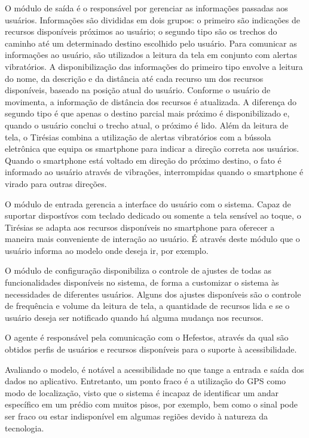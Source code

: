 \documentclass[english,brazilian]{UNISINOSmonografia}
\begin{document}
O módulo de saída é o responsável por gerenciar as informações passadas aos usuários. Informações são divididas em dois grupos: o primeiro são indicações de recursos disponíveis próximos ao usuário; o segundo tipo são os trechos do caminho até um determinado destino escolhido pelo usuário. Para comunicar as informações ao usuário, são utilizados a leitura da tela em conjunto com alertas vibratórios. A disponibilização das informações do primeiro tipo envolve a leitura do nome, da descrição e da distância até cada recurso um dos recursos disponíveis, baseado na posição atual do usuário. Conforme o usuário de movimenta, a informação de distância dos recursos é atualizada. A diferença do segundo tipo é que apenas o destino parcial mais próximo é disponibilizado e, quando o usuário conclui o trecho atual, o próximo é lido. Além da leitura de tela, o Tirésias combina a utilização de alertas vibratórios com a bússola eletrônica que equipa os smartphone para indicar a direção correta aos usuários. Quando o smartphone está voltado em direção do próximo destino, o fato é informado ao usuário através de vibrações, interrompidas quando o smartphone é virado para outras direções.

O módulo de entrada gerencia a interface do usuário com o sistema. Capaz de suportar dispostívos com teclado dedicado ou somente a tela sensível ao toque, o Tirésias se adapta aos recursos disponíveis no smartphone para oferecer a maneira mais conveniente de interação ao usuário. É através deste módulo que o usuário informa ao modelo onde deseja ir, por exemplo.

O módulo de configuração disponibiliza o controle de ajustes de todas as funcionalidades disponíveis no sistema, de forma a customizar o sistema às necessidades de diferentes usuários. Alguns dos ajustes disponíveis são o controle de frequência e volume da leitura de tela, a quantidade de recursos lida e se o usuário deseja ser notificado quando há alguma mudança nos recursos.

O agente é responsável pela comunicação com o Hefestos, através da qual são obtidos perfis de usuários e recursos disponíveis para o suporte à acessibilidade. 

Avaliando o modelo, é notável a acessibilidade no que tange a entrada e saída dos dados no aplicativo. Entretanto, um ponto fraco é a utilização do GPS como modo de localização, visto que o sistema é incapaz de identificar um andar específico em um prédio com muitos pisos, por exemplo, bem como o sinal pode ser fraco ou estar indisponível em algumas regiões devido à natureza da tecnologia. 
\end{document}
